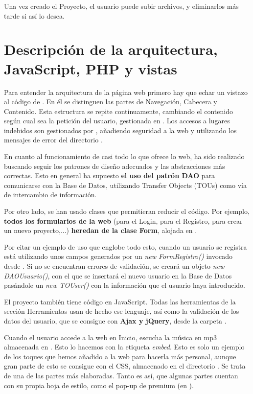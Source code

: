 \documentclass[12pt]{report}
\begin{document}
Una vez creado el Proyecto, el usuario puede subir archivos, y eliminarlos más tarde si así lo desea.

\newpage

\section{Descripción de la arquitectura, JavaScript, PHP y vistas}

Para entender la arquitectura de la página web primero hay que echar un vistazo al código de . En él se distinguen las partes de Navegación, Cabecera y Contenido. Esta estructura se repite continuamente, cambiando el contenido según cual sea la petición del usuario, gestionada en . Los accesos a lugares indebidos son gestionados por , añadiendo seguridad a la web y utilizando los mensajes de error del directorio .

En cuanto al funcionamiento de casi todo lo que ofrece lo web, ha sido realizado buscando seguir los patrones de diseño adecuados y las abstracciones más correctas. Esto en general ha supuesto \textbf{el uso del patrón DAO} para comunicarse con la Base de Datos, utilizando Transfer Objects (TOUs) como vía de intercambio de información.

Por otro lado, se han usado clases que permitieran reducir el código. Por ejemplo, \textbf{todos los formularios de la web} (para el Login, para el Registro, para crear un nuevo proyecto,...) \textbf{heredan de la clase Form}, alojada en .

Por citar un ejemplo de uso que englobe todo esto, cuando un usuario se registra está utilizando unos campos generados por un \textit{new FormRegistro()} invocado desde . Si no se encuentran errores de validación, se creará un objeto \textit{new DAOUsuario()}, con el que se insertará el nuevo usuario en la Base de Datos pasándole un \textit{new TOUser()} con la información que el usuario haya introducido.

El proyecto también tiene código en JavaScript. Todas las herramientas de la sección Herramientas usan de hecho ese lenguaje, así como la validación de los datos del usuario, que se consigue con \textbf{Ajax y jQuery}, desde la carpeta .

Cuando el usuario accede a la web en Inicio, escucha la música en mp3 almacenada en . Esto lo hacemos con la etiqueta \textit{embed}. Esto es solo un ejemplo de los toques que hemos añadido a la web para hacerla más personal, aunque gran parte de esto se consigue con el CSS, almacenado en el directorio . Se trata de una de las partes más elaboradas. Tanto es así, que algunas partes cuentan con su propia hoja de estilo, como el pop-up de premium (en ).
\end{document}
